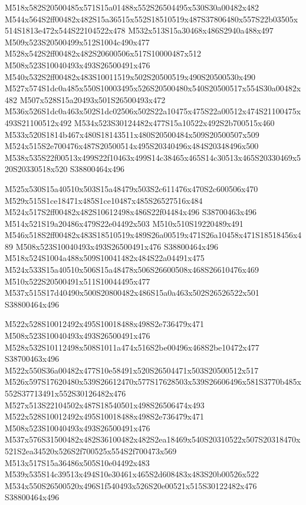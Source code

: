 \documentclass{article}
\begin{document}
\begin{multicols}{2}
M518x582S20500485x571S15a01488x552S26504495x530S30a00482x482 M544x564S2ff00482x482S15a36515x552S18510519x487S37806480x557S22b03505x514S1813e472x544S22104522x478 M532x513S15a30468x486S2940a488x497 M509x523S20500499x512S1004c490x477 M528x542S2ff00482x482S20600506x517S10000487x512 M508x523S10040493x493S26500491x476 M540x532S2ff00482x483S10011519x502S20500519x490S20500530x490 M527x574S1dc0a485x550S10003495x526S20500480x540S20500517x554S30a00482x482 M507x528S15a20493x501S26500493x472 M536x526S1dc0a463x502S1dc02506x502S22a10475x475S22a00512x474S21100475x493S21100512x492 M534x523S30124482x477S15a10522x492S2b700515x460 M533x520S1814b467x480S18143511x480S20500484x509S20500507x509 M524x515S2e700476x487S20500514x495S20340496x484S20348496x500 M538x535S22f00513x499S22f10463x499S14c38465x465S14c30513x465S20330469x520S20330518x520 S38800464x496

M525x530S15a40510x503S15a48479x503S2c611476x470S2c600506x470 M529x515S1ce18471x485S1ce10487x485S26527516x484 M524x517S2ff00482x482S10612498x486S22f04484x496 S38700463x496 M514x521S19a20486x479S22e04492x503 M510x510S19220489x491 M546x518S2ff00482x483S18510519x489S26a00519x471S26a10458x471S18518456x489 M508x523S10040493x493S26500491x476 S38800464x496 M518x524S1004a488x509S10041482x484S22a04491x475 M524x533S15a40510x506S15a48478x506S26600508x468S26610476x469 M510x522S20500491x511S10044495x477 M537x515S17d40490x500S20800482x486S15a0a463x502S26526522x501 S38800464x496

M522x528S10012492x495S10018488x498S2e736479x471 M508x523S10040493x493S26500491x476 M528x532S10112498x508S1011a474x516S2be00496x468S2be10472x477 S38700463x496 M522x550S36a00482x477S10e58491x520S26504471x503S20500512x517 M526x597S17620480x539S26612470x577S17628503x539S26606496x581S3770b485x552S37713491x552S30126482x476 M527x513S22104502x487S18540501x498S26506474x493 M522x528S10012492x495S10018488x498S2e736479x471 M508x523S10040493x493S26500491x476 M537x576S31500482x482S36100482x482S2ea18469x540S20310522x507S20318470x521S2ea34520x526S2f700525x554S2f700473x569 M513x517S15a36486x505S10e04492x483 M539x535S14c39513x494S10e30461x465S2d608483x483S20b00526x522 M534x550S26500520x496S1f540493x526S20e00521x515S30122482x476 S38800464x496


\end{multicols}
\end{document}
